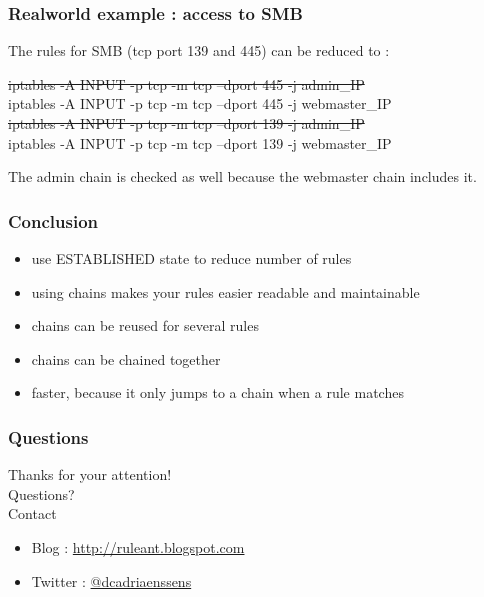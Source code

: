 \documentclass[14pt]{beamer}
\begin{document}
  \begin{frame}
    \frametitle{Realworld example : access to SMB}
    The rules for SMB (tcp port 139 and 445) can be reduced to :
    \begin{example}
      \small{\sout{iptables -A INPUT -p tcp -m tcp --dport 445 -j admin\_IP}\\
      iptables -A INPUT -p tcp -m tcp --dport 445 -j webmaster\_IP\\
      \sout{iptables -A INPUT -p tcp -m tcp --dport 139 -j admin\_IP}\\
      iptables -A INPUT -p tcp -m tcp --dport 139 -j webmaster\_IP}
    \end{example}
  The admin chain is checked as well because the webmaster chain includes it.
  \end{frame}

  \begin{frame}
    \frametitle{Conclusion}
    \begin{itemize}
      \item use ESTABLISHED state to reduce number of rules
      \item using chains makes your rules easier readable and maintainable
      \item chains can be reused for several rules
      \item chains can be chained together
      \item faster, because it only jumps to a chain when a rule matches
    \end{itemize}
  \end{frame}
  \begin{frame}
   \frametitle{Questions}
    Thanks for your attention!\\
    Questions?\\
    Contact
    \begin{itemize}
      \item Blog : \href{http://ruleant.blogspot.com/}{http://ruleant.blogspot.com}
      \item Twitter : \href{https://twitter.com/dcadriaenssens}{@dcadriaenssens}
    \end{itemize}
  \end{frame}
\end{document}
